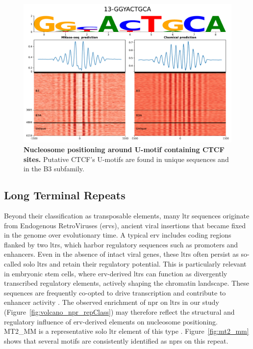 \documentclass[11pt]{book}
\begin{document}
\begin{figure}[htbp]
    \centering
    \includegraphics[width=\textwidth]{Figures/Results/xstreme_onrep_meta_hm/13-GGYACTGCA.pdf}
    \caption{\textbf{Nucleosome positioning around U-motif containing CTCF sites.} Putative CTCF's U-motifs are found in unique sequences and in the B3 subfamily.}
    \label{fig:Umotif_on_genome}
\end{figure}

\FloatBarrier
\subsection{Long Terminal Repeats}
Beyond their classification as transposable elements, many \gls{ltr} sequences originate from Endogenous RetroViruses (\glspl{erv}), ancient viral insertions that became fixed in the genome over evolutionary time. A typical \gls{erv} includes coding regions flanked by two \glspl{ltr}, which harbor regulatory sequences such as promoters and enhancers. Even in the absence of intact viral genes, these \glspl{ltr} often persist as so-called solo \glspl{ltr} and retain their regulatory potential. This is particularly relevant in embryonic stem cells, where \gls{erv}-derived \glspl{ltr} can function as divergently transcribed regulatory elements, actively shaping the chromatin landscape. These sequences are frequently co-opted to drive transcription and contribute to enhancer activity \cite{bakoulis_endogenous_2022}. The observed enrichment of \gls{npr} on \glspl{ltr} in our study (Figure~\ref{fig:volcano_npr_repClass}) may therefore reflect the structural and regulatory influence of \gls{erv}-derived elements on nucleosome positioning. MT2\_MM is a representative solo \gls{ltr} element of this type \cite{Bao2020_MT2_MM}. Figure~\ref{fig:mt2_mm} shows that several motifs are consistently identified as \glspl{npr} on this repeat. 
\end{document}
